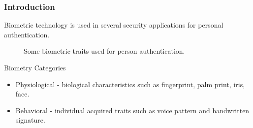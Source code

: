 \documentclass{beamer}
\begin{document}
\begin{frame}
\frametitle{Introduction}

\centering
Biometric technology is used in several security applications for personal authentication. 
\begin{figure}[!htb]
\centering


\pause
\hspace*{0.1in} %
\hspace*{0.1in}%
\hspace*{0.1in}%
 
\caption{Some biometric traits used for person authentication. } %



\end{figure}
\pause
\begin{block}{Biometry Categories}
\begin{itemize}
\item Physiological - biological characteristics such as fingerprint, palm print, iris, face.
\item Behavioral - individual acquired traits such as voice pattern and handwritten signature. 

\end{itemize}

\end{block}



\end{frame}
\end{document}
